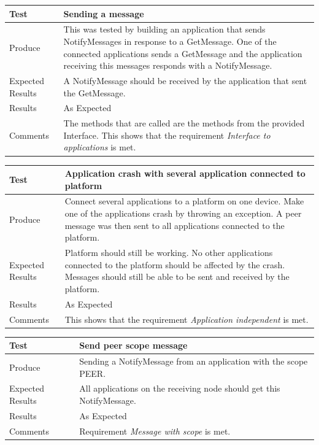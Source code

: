 \begin{center}
    \begin{tabular}{ | l | p{12cm} |}
    \hline
    Test 	 				& 		 Sending a message\\ \hline
	Produce  				& 		 This was tested by building an application that sends NotifyMessages in response to a GetMessage. One of the connected applications sends a GetMessage and the application receiving this messages responds with a NotifyMessage.\\ \hline
	Expected Results  		& 		 A NotifyMessage should be received by the application that sent the GetMessage.\\ \hline
	Results 				& 		 As Expected\\ \hline
	Comments				& 		 The methods that are called are the methods from the provided Interface. This shows that the requirement \emph{Interface to applications} is met. \\ \hline
    \end{tabular}
\end{center}

\begin{center}
    \begin{tabular}{ | l | p{12cm} |}
    \hline
    Test 	 				& 		 Application crash with several application connected to platform\\ \hline
	Produce  				& 		 Connect several applications to a platform on one device. Make one of the applications crash by throwing an exception. A peer message was then sent to all applications connected to the platform.\\ \hline
	Expected Results  		& 		 Platform should still be working. No other applications connected to the platform should be affected by the crash. Messages should still be able to be sent and received by the platform.\\ \hline
	Results 				& 		 As Expected\\ \hline
	Comments				& 		 This shows that the requirement \emph{Application independent} is met.\\ \hline
    \end{tabular}
\end{center}

\begin{center}
    \begin{tabular}{ | l | p{12cm} |}
    \hline
    Test 	 				& 		 Send peer scope message\\ \hline
	Produce  				& 		 Sending a NotifyMessage from an application with the scope PEER. \\ \hline
	Expected Results  		& 		 All applications on the receiving node should get this NotifyMessage.\\ \hline
	Results 				& 		 As Expected\\ \hline
	Comments				& 		 Requirement \emph{Message with scope} is met.\\ \hline
    \end{tabular}
\end{center}


